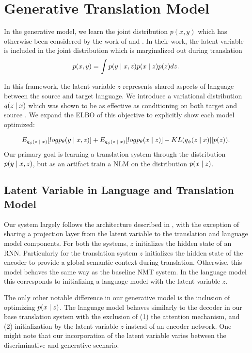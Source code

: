 \section{Generative Translation Model}

In the generative model, we learn the joint distribution $p(x, y)$ which has otherwise been considered by the work of \citet{eikema2018AEVNMT} and \citet{harshil2018GNMT}. In their work, the latent variable is included in the joint distribution which is marginalized out during translation
\begin{equation}
	p(x, y) = \int p(y \; | \;{x, z})  p(x\; | \;{z}) p(z) dz.
\end{equation}

In this framework, the latent variable $z$ represents shared aspects of language between the source and target language. We introduce a variational distribution $q( z\; | \;{x})$ which was shown to be as effective as conditioning on both target and source \cite{eikema2018AEVNMT}. We expand the \ac{ELBO} of this objective to explicitly show each model optimized:

\begin{equation}
E_{q_{\phi}(z \; | \;{x})} [ log p_{\theta}(y \; | \;{x, z})] +
E_{q_{\phi}(z \; | \;{x})} [ log p_{\theta}(x \; | \;{z})] -
	KL(q_{\phi}(z \; | \;{x}) || p(z)).
\end{equation}
Our primary goal is learning a translation system through the distribution $p(y \; | \;{x, z})$, but  as an artifact train a \ac{NLM} on the distribution $p(x \; | \;{z})$.

\subsection{Latent Variable in Language and Translation Model}


Our system largely follows the architecture described in \citet{eikema2018AEVNMT}, with the exception of sharing a projection layer from the latent variable to the translation and language model components. For both the systems, $z$ initializes the hidden state of an \ac{RNN}. Particularly for the translation system $z$  initializes the hidden state of the encoder to provide a global semantic context during translation. Otherwise, this model behaves the same way as the baseline \ac{NMT} system. In the language model this corresponds to initializing a language model with the latent variable $z$. 


The only other notable difference in our generative model is the inclusion of optimizing $p(x \; | \;{z})$. The language model behaves similarly to the decoder in our base translation system with the exclusion of (1) the attention mechanism, and (2) initialization by the latent variable $z$ instead of an encoder network. One might note that our incorporation of the latent variable varies between the discriminative and generative scenario. %

